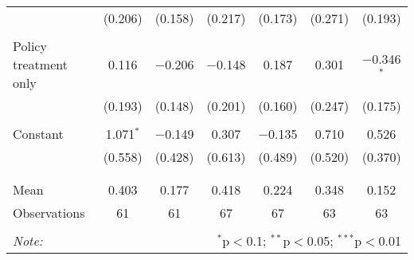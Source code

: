 \begin{tabular}{@{\extracolsep{5pt}}lcccccc}
  & (0.206) & (0.158) & (0.217) & (0.173) & (0.271) & (0.193) \\ 
  & & & & & & \\ 
 Policy treatment only & 0.116 & $-$0.206 & $-$0.148 & 0.187 & 0.301 & $-$0.346$^{*}$ \\ 
  & (0.193) & (0.148) & (0.201) & (0.160) & (0.247) & (0.175) \\ 
  & & & & & & \\ 
 Constant & 1.071$^{*}$ & $-$0.149 & 0.307 & $-$0.135 & 0.710 & 0.526 \\ 
  & (0.558) & (0.428) & (0.613) & (0.489) & (0.520) & (0.370) \\ 
  & & & & & & \\ 
\hline \\[-1.8ex] 
Mean & 0.403 & 0.177 & 0.418 & 0.224 & 0.348 & 0.152 \\ 
Observations & 61 & 61 & 67 & 67 & 63 & 63 \\ 
\hline 
\hline \\[-1.8ex] 
\textit{Note:}  & \multicolumn{6}{r}{$^{*}$p$<$0.1; $^{**}$p$<$0.05; $^{***}$p$<$0.01} \\ 
\end{tabular} 
